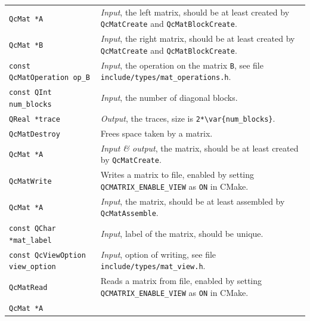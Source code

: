 \documentclass[a4paper,11pt,twoside,openright]{book}
\begin{document}
\begin{center}
\begin{longtable}{l|p{}}
    \hspace*{2ex}\verb|QcMat *A| %
      & \textsl{Input}, the left matrix, should be at least created by
        \verb|QcMatCreate| and \verb|QcMatBlockCreate|.\\
    \hspace*{2ex}\verb|QcMat *B| %
      & \textsl{Input}, the right matrix, should be at least created by
        \verb|QcMatCreate| and \verb|QcMatBlockCreate|.\\ 
    \hspace*{2ex}\verb|const QcMatOperation op_B| %
      & \textsl{Input}, the operation on the matrix \verb|B|, see file
        \verb|include/types/mat_operations.h|.\\
    \hspace*{2ex}\verb|const QInt num_blocks| %
      & \textsl{Input}, the number of diagonal blocks.\\
    \hspace*{2ex}\verb|QReal *trace| %
      & \textsl{Output}, the traces, size is \verb|2*\var{num_blocks}|.\\
    \hline
%
    \verb|QcMatDestroy|\index{\texttt{QcMatDestroy}} %
      & Frees space taken by a matrix.\\
    \hspace*{2ex}\verb|QcMat *A| %
      & \textsl{Input \& output}, the matrix, should be at least created by
        \verb|QcMatCreate|.\\
    \hline
%
    \verb|QcMatWrite|\index{\texttt{QcMatWrite}} %
      & Writes a matrix to file, enabled by setting \verb|QCMATRIX_ENABLE_VIEW| as
        \verb|ON| in CMake.\\
    \hspace*{2ex}\verb|QcMat *A| %
      & \textsl{Input}, the matrix, should be at least assembled by \verb|QcMatAssemble|.\\
    \hspace*{2ex}\verb|const QChar *mat_label| %
      & \textsl{Input}, label of the matrix, should be unique.\\
    \hspace*{2ex}\verb|const QcViewOption view_option| %
      & \textsl{Input}, option of writing, see file
        \verb|include/types/mat_view.h|.\\
    \hline
%
    \verb|QcMatRead|\index{\texttt{QcMatRead}} %
      & Reads a matrix from file, enabled by setting \verb|QCMATRIX_ENABLE_VIEW| as
        \verb|ON| in CMake.\\
    \hspace*{2ex}\verb|QcMat *A| %

\end{longtable}
\end{center}
\end{document}
